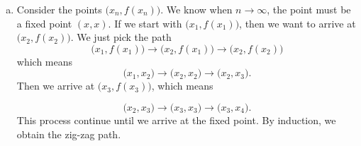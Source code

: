 \begin{Exercise}
\begin{enumerate}[(a)]
\item
\begin{solution}
Consider the points $\big(x_n, f(x_n)\big)$.
We know when $n\to\infty$, the point must be a fixed point $(x, x)$.
If we start with $\big(x_1, f(x_1)\big)$, then we want to arrive at $\big(x_2, f(x_2)\big)$. We just pick the path
$$
\big(x_1, f(x_1)\big) \to \big(x_2, f(x_1)\big) \to \big(x_2, f(x_2)\big)
$$
which means
$$
\big(x_1, x_2\big) \to \big(x_2, x_2\big) \to \big(x_2, x_3\big).
$$
Then we arrive at $\big(x_3, f(x_3)\big)$, which means

$$
\big(x_2, x_3\big) \to \big(x_3, x_3\big) \to \big(x_3, x_4\big).
$$
This process continue until we arrive at the fixed point.
By induction, we obtain the zig-zag path.
\end{solution}
\end{enumerate}
\end{Exercise}